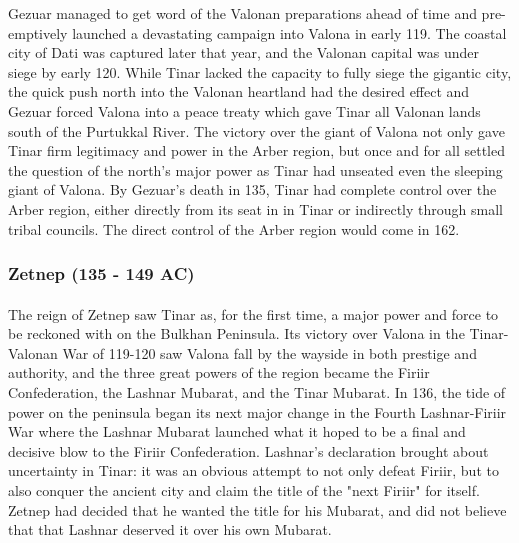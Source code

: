 Gezuar managed to get word of the Valonan preparations ahead of time and pre-emptively launched a devastating campaign into Valona in early 119. The coastal city of Dati was captured later that year, and the Valonan capital was under siege by early 120. While Tinar lacked the capacity to fully siege the gigantic city, the quick push north into the Valonan heartland had the desired effect and Gezuar forced Valona into a peace treaty which gave Tinar all Valonan lands south of the Purtukkal River. The victory over the giant of Valona not only gave Tinar firm legitimacy and power in the Arber region, but once and for all settled the question of the north's major power as Tinar had unseated even the sleeping giant of Valona. By Gezuar's death in 135, Tinar had complete control over the Arber region, either directly from its seat in in Tinar or indirectly through small tribal councils. The direct control of the Arber region would come in 162.
\subsubsection{Zetnep (135 - 149 AC)}
\paragraph{}
The reign of Zetnep saw Tinar as, for the first time, a major power and force to be reckoned with on the Bulkhan Peninsula. Its victory over Valona in the Tinar-Valonan War of 119-120 saw Valona fall by the wayside in both prestige and authority, and the three great powers of the region became the Firiir Confederation, the Lashnar Mubarat, and the Tinar Mubarat. In 136, the tide of power on the peninsula began its next major change in the Fourth Lashnar-Firiir War where the Lashnar Mubarat launched what it hoped to be a final and decisive blow to the Firiir Confederation. Lashnar's declaration brought about uncertainty in Tinar: it was an obvious attempt to not only defeat Firiir, but to also conquer the ancient city and claim the title of the "next Firiir" for itself. Zetnep had decided that he wanted the title for his Mubarat, and did not believe that that Lashnar deserved it over his own Mubarat.

